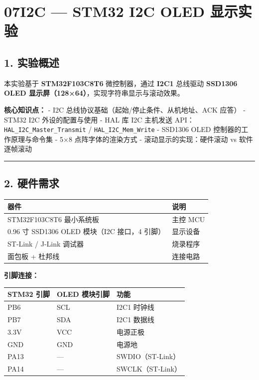 \documentclass[
  chinese,
  UTF8,
  oneside,
  openany]{ctexbook}
\begin{document}
\chapter{07I2C --- STM32 I2C OLED
显示实验}\label{i2c-stm32-i2c-oled-ux663eux793aux5b9eux9a8c}

\section{1. 实验概述}\label{ux5b9eux9a8cux6982ux8ff0-2}

本实验基于 \textbf{STM32F103C8T6} 微控制器，通过 \textbf{I2C1} 总线驱动
\textbf{SSD1306 OLED 显示屏（128×64）}，实现字符串显示与滚动效果。

\textbf{核心知识点：} - I2C 总线协议基础（起始/停止条件、从机地址、ACK
应答） - STM32 I2C 外设的配置与使用 - HAL 库 I2C 主机发送
API：\texttt{HAL\_I2C\_Master\_Transmit} / \texttt{HAL\_I2C\_Mem\_Write}
- SSD1306 OLED 控制器的工作原理与命令集 - 5×8 点阵字体的渲染方式 -
滚动显示的实现：硬件滚动 vs 软件逐帧滚动

\begin{center}\rule{0.5\linewidth}{0.5pt}\end{center}

\section{2. 硬件需求}\label{ux786cux4ef6ux9700ux6c42-2}

\begin{longtable}[]{@{}ll@{}}
\toprule\noalign{}
器件 & 说明 \\
\midrule\noalign{}
\endhead
\bottomrule\noalign{}
\endlastfoot
STM32F103C8T6 最小系统板 & 主控 MCU \\
0.96 寸 SSD1306 OLED 模块（I2C 接口，4 引脚） & 显示设备 \\
ST-Link / J-Link 调试器 & 烧录程序 \\
面包板 + 杜邦线 & 连接电路 \\
\end{longtable}

\textbf{引脚连接：}

\begin{longtable}[]{@{}lll@{}}
\toprule\noalign{}
STM32 引脚 & OLED 模块引脚 & 功能 \\
\midrule\noalign{}
\endhead
\bottomrule\noalign{}
\endlastfoot
PB6 & SCL & I2C1 时钟线 \\
PB7 & SDA & I2C1 数据线 \\
3.3V & VCC & 电源正极 \\
GND & GND & 电源地 \\
PA13 & --- & SWDIO（ST-Link） \\
PA14 & --- & SWCLK（ST-Link） \\
\end{longtable}
\end{document}
